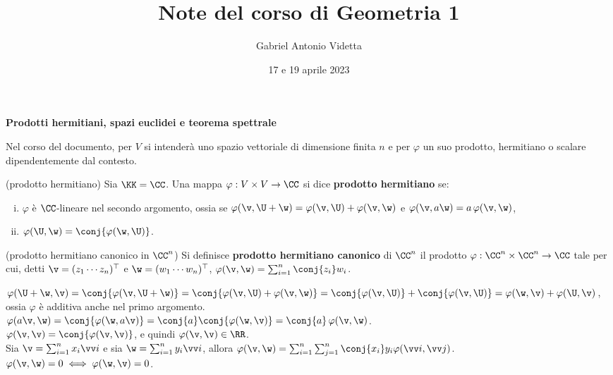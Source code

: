 \documentclass[11pt]{article}
\title{\textbf{Note del corso di Geometria 1}}
\author{Gabriel Antonio Videtta}
\date{17 e 19 aprile 2023}
\begin{document}
	
	\maketitle
	
	\begin{center}
		\Large \textbf{Prodotti hermitiani, spazi euclidei e teorema spettrale}
	\end{center}
	
	\begin{note}
		Nel corso del documento, per $V$ si intenderà uno spazio vettoriale di dimensione
		finita $n$ e per $\varphi$ un suo prodotto, hermitiano o scalare
		dipendentemente dal contesto.
	\end{note}

	\begin{definition} (prodotto hermitiano) Sia $\KK = \CC$. Una mappa $\varphi : V \times V \to \CC$ si dice \textbf{prodotto hermitiano} se:
		
		\begin{enumerate}[(i)]
			\item $\varphi$ è $\CC$-lineare nel secondo argomento, ossia se $\varphi(\v, \U + \w) = \varphi(\v, \U) + \varphi(\v, \w)$ e
			$\varphi(\v, a \w) = a \, \varphi(\v, \w)$,
			\item $\varphi(\U, \w) = \conj{\varphi(\w, \U)}$.
		\end{enumerate}
	\end{definition}

	\begin{definition} (prodotto hermitiano canonico in $\CC^n$) Si definisce
		\textbf{prodotto hermitiano canonico} di $\CC^n$ il prodotto $\varphi : \CC^n \times \CC^n \to \CC$ tale per cui, detti $\v = (z_1 \cdots z_n)^\top$ e $\w = (w_1 \cdots w_n)^\top$, $\varphi(\v, \w) = \sum_{i=1}^n \conj{z_i} w_i$.
	\end{definition}

	\begin{remark}\nl
		\li $\varphi(\U + \w, \v) = \conj{\varphi(\v, \U + \w)} =
		\conj{\varphi(\v, \U) + \varphi(\v, \w)} = \conj{\varphi(\v, \U)} + \conj{\varphi(\v, \U)} = \varphi(\w, \v) + \varphi(\U, \v)$, ossia
		$\varphi$ è additiva anche nel primo argomento. \\
		\li $\varphi(a \v, \w) = \conj{\varphi(\w, a \v)} = \conj{a} \conj{\varphi(\w, \v)} = \conj{a} \, \varphi(\v, \w)$. \\
		\li $\varphi(\v, \v) = \conj{\varphi(\v, \v)}$, e quindi $\varphi(\v, \v) \in \RR$. \\
		\li Sia $\v = \sum_{i=1}^n x_i \vv i$ e sia $\w = \sum_{i=1}^n y_i \vv i$, allora $\varphi(\v, \w) = \sum_{i =1}^n \sum_{j=1}^n \conj{x_i} y_i \varphi(\vv i, \vv j)$. \\
		\li $\varphi(\v, \w) = 0 \iff \varphi(\w, \v) = 0$.
	\end{remark}
\end{document}
